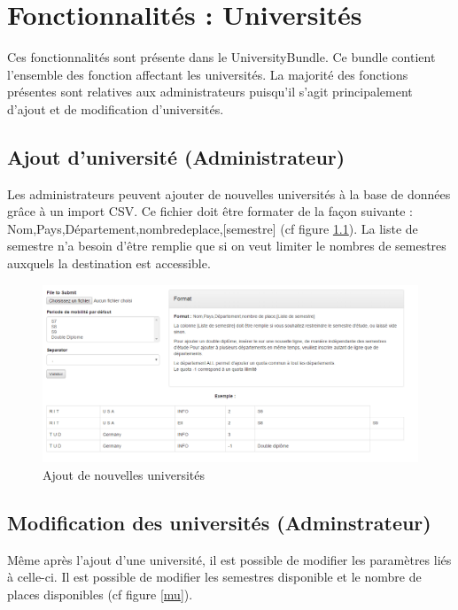 \chapter{Fonctionnalités : Universités}

Ces fonctionnalités sont présente dans le UniversityBundle. Ce bundle contient l'ensemble des fonction affectant les universités. La majorité des fonctions présentes sont relatives aux administrateurs puisqu'il s'agit principalement d'ajout et de modification d'universités.

\section{Ajout d'université (Administrateur)}

Les administrateurs peuvent ajouter de nouvelles universités à la base de données grâce à un import CSV. Ce fichier doit être formater de la façon suivante : Nom,Pays,Département,nombredeplace,[semestre] (cf figure \ref{au}).
\smallbreak
La liste de semestre n'a besoin d'être remplie que si on veut limiter le nombres de semestres auxquels la destination est accessible.

\begin{figure}[H]
	\centering
	\includegraphics[scale=0.35]{images/au.png}
	\caption{Ajout de nouvelles universités}
	\label{au}
\end{figure}

\section{Modification des universités (Adminstrateur)}

Même après l'ajout d'une université, il est possible de modifier les paramètres liés à celle-ci. Il est possible de modifier les semestres disponible et le nombre de places disponibles (cf figure \ref{mu}).

